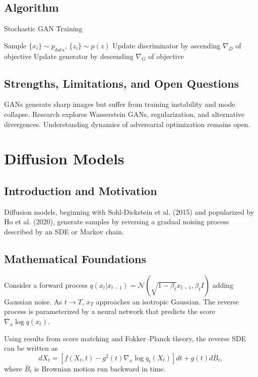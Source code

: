 \documentclass[11pt]{book}
\begin{document}
\subsection{Algorithm}
\begin{algorithm}
\caption{Stochastic GAN Training}
\begin{algorithmic}[1]
    \STATE Sample $\{x_i\}\sim p_{\text{data}}$, $\{z_i\}\sim p(z)$
    \STATE Update discriminator by ascending $\nabla_D$ of objective
    \STATE Update generator by descending $\nabla_G$ of objective
\ENDFOR
\end{algorithmic}
\end{algorithm}

\subsection{Strengths, Limitations, and Open Questions}
GANs generate sharp images but suffer from training instability and mode collapse. Research explores Wasserstein GANs, regularization, and alternative divergences. Understanding dynamics of adversarial optimization remains open.

\section{Diffusion Models}
\subsection{Introduction and Motivation}
Diffusion models, beginning with Sohl-Dickstein et al. (2015) and popularized by Ho et al. (2020), generate samples by reversing a gradual noising process described by an SDE or Markov chain.

\subsection{Mathematical Foundations}
Consider a forward process $q(x_t|x_{t-1})=\mathcal{N}(\sqrt{1-\beta_t}x_{t-1},\beta_t I)$ adding Gaussian noise. As $t\to T$, $x_T$ approaches an isotropic Gaussian. The reverse process is parameterized by a neural network that predicts the score $\nabla_x \log q(x_t)$.

Using results from score matching \cite{hyvarinen2005} and Fokker--Planck theory, the reverse SDE can be written as
\begin{equation}
dX_t = \left[f(X_t,t) - g^2(t)\nabla_x \log q_t(X_t)\right]dt + g(t)d\bar{B}_t,
\end{equation}
where $\bar{B}_t$ is Brownian motion run backward in time.
\end{document}
